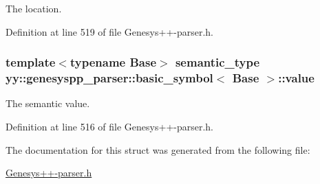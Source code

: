 The location. 



Definition at line 519 of file Genesys++-\/parser.\-h.

\hypertarget{structyy_1_1genesyspp__parser_1_1basic__symbol_a66fa4a750b9ae7e8be9c640b8712fe0b}{
\subsubsection[{value}]{\setlength{\rightskip}{0pt plus 5cm}template$<$typename Base$>$ {\bf semantic\-\_\-type} {\bf yy\-::genesyspp\-\_\-parser\-::basic\-\_\-symbol}$<$ Base $>$\-::value}}\label{structyy_1_1genesyspp__parser_1_1basic__symbol_a66fa4a750b9ae7e8be9c640b8712fe0b}


The semantic value. 



Definition at line 516 of file Genesys++-\/parser.\-h.



The documentation for this struct was generated from the following file\-:\begin{DoxyCompactItemize}
\item 
\hyperlink{_genesys_09_09-parser_8h}{Genesys++-\/parser.\-h}\end{DoxyCompactItemize}
